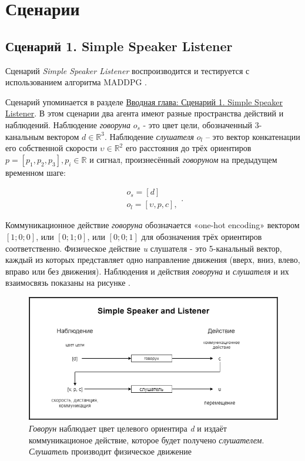 \section{Сценарии}

\subsection{Сценарий 1. Simple Speaker Listener}  \label{exp-ssl}

Сценарий \textit{Simple Speaker Listener} воспроизводится и тестируется с использованием алгоритма MADDPG \cite{lowe2017multiagent}.

Сценарий упоминается в разделе \hyperref[intro:ssl]{Вводная глава: Сценарий 1. Simple Speaker Listener}. В этом сценарии два агента имеют разные пространства действий и наблюдений. Наблюдение \textit{говоруна} $o_s$ - это цвет цели, обозначенный 3- канальным вектором $d \in \mathbb{R}^3$. Наблюдение \textit{слушателя} $o_l$ – это вектор конкатенации его собственной скорости $\upsilon \in \mathbb{R}^2$ его расстояния до трёх ориентиров $p = [p_1, p_2, p_3], p_i \in \mathbb{R}$ и сигнал, произнесённый \textit{говоруном} на предыдущем временном шаге:

\begin{equation}
    \begin{multlined}
        o_s = [d] \\
        o_l = [\upsilon, p, c], %
    \end{multlined}.
\end{equation}

Коммуникационное действие \textit{говоруна} обозначается «one-hot encoding» вектором $[1; 0; 0]$, или $[0; 1; 0]$, или $[0; 0; 1]$ для обозначения трёх ориентиров соответственно.
Физическое действие \textit{u} слушателя - это 5-канальный вектор, каждый из которых представляет одно направление движения (вверх, вниз, влево, вправо или без движения). Наблюдения и действия \textit{говоруна} и \textit{слушателя} и их взаимосвязь показаны на рисунке .

\begin{figure}[ht!]
    \center
    \includegraphics [scale=0.60] {my_folder/images/ch4/simple_speaker_listener.png}
    \caption{\textit{Говорун} наблюдает цвет целевого ориентира \textit{d} и издаёт коммуникационое действие, которое будет получено \textit{слушателем}. \textit{Слушатель} производит физическое движение}
    \label{fig:ch4-ssl}
\end{figure}

